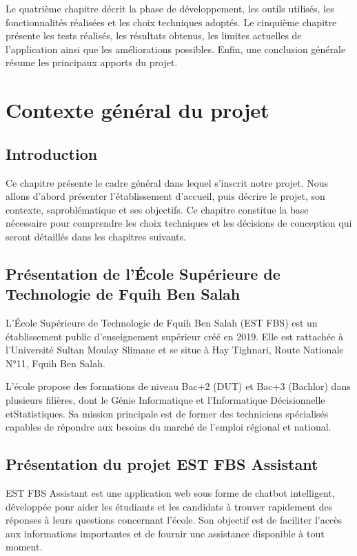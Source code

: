 \documentclass[12pt,a4paper]{report}
\begin{document}
Le quatrième chapitre décrit la phase de développement, les outils utilisés, les \newline fonctionnalités réalisées et les choix techniques adoptés.
Le cinquième chapitre présente les tests réalisés, les résultats obtenus, les limites actuelles de l’application ainsi que les \newline  améliorations possibles.
Enfin, une conclusion générale résume les principaux apports du projet.

\chapter{Contexte général du projet}

\section{Introduction}
Ce chapitre présente le cadre général dans lequel s'inscrit notre projet. Nous allons d'abord présenter l'établissement d'accueil, puis décrire le projet, son contexte, sa\newline problématique et ses objectifs. Ce chapitre constitue la base nécessaire pour comprendre les choix techniques et les décisions de conception qui seront détaillés dans les chapitres suivants.


\section{Présentation de l'École Supérieure de Technologie de Fquih Ben Salah}
L'École Supérieure de Technologie de Fquih Ben Salah (EST FBS) est un \newline établissement public d'enseignement supérieur créé en 2019. Elle est rattachée à \newline l'Université Sultan Moulay Slimane et se situe à Hay Tighnari, Route \newline Nationale N°11, Fquih Ben Salah. \newline

L'école propose des formations de niveau Bac+2 (DUT) et Bac+3 (Bachlor) dans \newline plusieurs filières, dont le Génie Informatique et l'Informatique Décisionnelle et\newline Statistiques. Sa mission principale est de former des techniciens spécialisés \newline capables de répondre aux besoins du marché de l'emploi régional et national.
 \newpage
\section{Présentation du projet EST FBS Assistant}
EST FBS Assistant est une application web sous forme de chatbot intelligent, \newline développée pour aider les étudiants et les candidats à trouver rapidement des réponses à leurs questions concernant l’école. Son objectif est de faciliter l’accès aux informations importantes et de fournir une assistance disponible à tout moment. \newline
\end{document}
